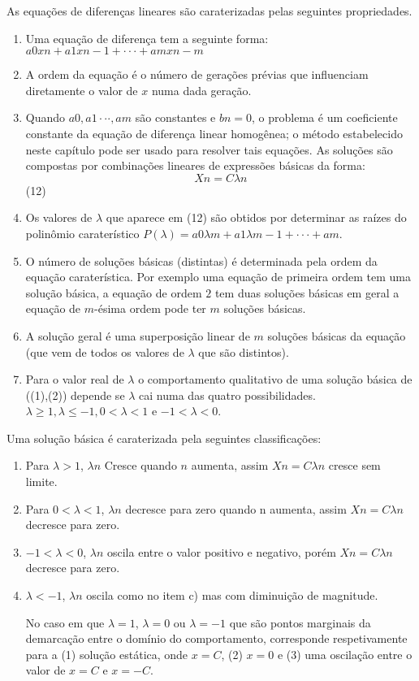 As equações de diferenças lineares são caraterizadas pelas seguintes propriedades. 
\begin{enumerate}
\item Uma equação de diferença tem a seguinte forma: 
$a0xn + a1xn-1 + ··· + amxn-m$
\item A ordem da equação é o número de gerações prévias que influenciam diretamente o valor de $x$ numa dada geração. 
\item Quando $a0,a1 ··· ,am$ são constantes e $bn = 0$, o problema é um coeficiente constante da equação de diferença linear homogênea; o método estabelecido neste capítulo pode ser usado para resolver tais equações. As soluções são compostas por combinações lineares de expressões básicas da forma: 
\begin{equation} Xn = C\lambda n\end{equation} (12) 
\item Os valores de $\lambda$ que aparece em (12) são obtidos por determinar as raízes do polinômio caraterístico $P(\lambda) = a0\lambda m + a1\lambda m-1 + ··· + am$. 
\item O número de soluções básicas (distintas) é determinada pela ordem da equação caraterística. Por exemplo uma equação de primeira ordem tem uma solução básica, a equação de ordem $2$ tem duas soluções básicas em geral a equação de $m$-ésima ordem pode ter $m$ soluções básicas. 
\item A solução geral é uma superposição linear de $m$ soluções básicas da equação (que vem de todos os valores de $\lambda$ que são distintos). 
\item Para o valor real de $\lambda$ o comportamento qualitativo de uma solução básica de ((1),(2)) depende se $\lambda$ cai numa das quatro possibilidades. 
$\lambda \ge 1, \lambda \le -1, 0 < \lambda < 1$ e $-1 <\lambda< 0$.
\end{enumerate}


Uma solução básica é caraterizada pela seguintes classificações: 
\begin{enumerate}
\item Para $\lambda > 1$, $\lambda n$ Cresce quando $n$ aumenta, assim $Xn = C\lambda n$ cresce sem limite. 
\item Para $0 <\lambda< 1$, $\lambda n$ decresce para zero quando n aumenta, assim $Xn = C\lambda n$ decresce para zero. 
\item $-1 <\lambda< 0$, $\lambda n$ oscila entre o valor positivo e negativo, porém $Xn = C \lambda n$ decresce para zero. 
\item $\lambda < -1$, $\lambda n$ oscila como no item c) mas com diminuição de magnitude. 

No caso em que $\lambda = 1$, $\lambda = 0$ ou $\lambda = -1$ que são pontos marginais da demarcação entre o domínio do comportamento, corresponde respetivamente para a (1) solução estática, onde $x = C$, (2) $x = 0$ e (3) uma oscilação entre o valor de $x = C$ e $x = -C$. 
\end{enumerate}


